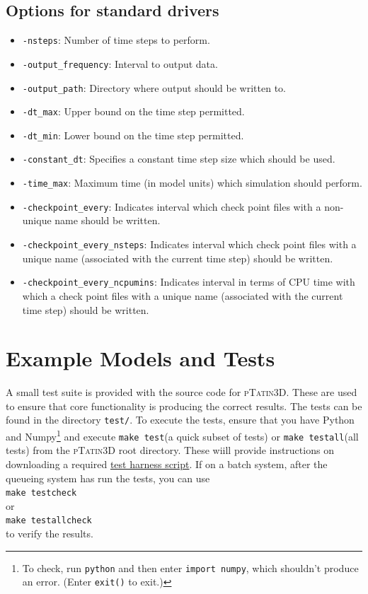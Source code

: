 \documentclass[paper=a4, fontsize=10pt,twoside]{scrartcl}
\newcommand{\ptat}{{{\textsc{pTatin3D}}}}
\newcommand{\shellcmd}[1]{\\\indent\indent\texttt{\hspace{5mm}\footnotesize #1}\\}
\newcommand{\unix}[1]{\texttt{\footnotesize #1}}
\begin{document}
\subsection{Options for standard drivers}
\begin{itemize}
	\item \unix{-nsteps}: Number of time steps to perform.
	\item \unix{-output\_frequency}: Interval to output data.
	\item \unix{-output\_path}: Directory where output should be written to.
	\item \unix{-dt\_max}: Upper bound on the time step permitted.
	\item \unix{-dt\_min}: Lower bound on the time step permitted.
	\item \unix{-constant\_dt}: Specifies a constant time step size which should be used.
	\item \unix{-time\_max}: Maximum time (in model units) which simulation should perform.
	\item \unix{-checkpoint\_every}: Indicates interval which check point files with a non-unique name should be written.
	\item \unix{-checkpoint\_every\_nsteps}: Indicates interval which check point files with a unique name (associated with the current time step) should be written.
	\item \unix{-checkpoint\_every\_ncpumins}: Indicates interval in terms of CPU time with which a check point files with a unique name (associated with the current time step) should be written.
\end{itemize}

\section{Example Models and Tests}
\label{sec:examples_and_tests}
A small test suite is provided with the source code for {\ptat}. These are used to ensure that core functionality is producing the correct results. The tests can be found in the directory \unix{test/}. To execute the tests, ensure that you have Python and Numpy\footnote{To check, run \unix{python} and then enter \unix{import numpy}, which shouldn't produce an error. (Enter \unix{exit()} to exit.)} and execute \unix{make test}(a quick subset of tests) or \unix{make testall}(all tests) from the \ptat{} root directory.
These wiill provide instructions on downloading a required \href{https://www.bitbucket.org/dmay/pythontestharness}{test harness script}.
If on a batch system, after the queueing system has run the tests, you can use \shellcmd{make testcheck} or \shellcmd{make testallcheck} to verify the results.
\end{document}
